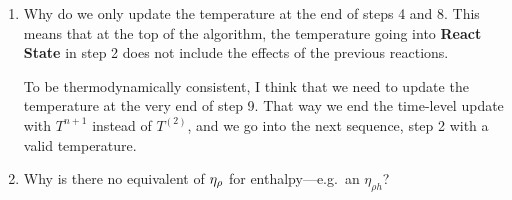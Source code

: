 \begin{enumerate}

\item Why do we only update the temperature at the end of steps 4 and
      8.  This means that at the top of the algorithm, the temperature
      going into {\bf React State} in step 2 does not include the
      effects of the previous reactions.

      To be thermodynamically consistent, I think that we need to
      update the temperature at the very end of step 9.  That way we
      end the time-level update with $T^{n+1}$ instead of $T^{(2)}$,
      and we go into the next sequence, step 2 with a valid temperature.

\item Why is there no equivalent of $\eta_{\rho}$ for enthalpy---e.g.\ an
      $\eta_{\rho h}$?

\end{enumerate}
